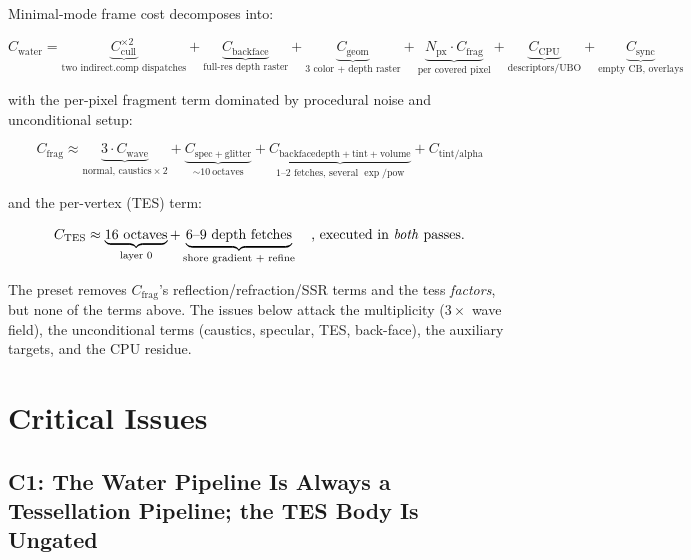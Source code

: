 \documentclass[11pt,a4paper]{article}
\begin{document}
Minimal-mode frame cost decomposes into:

\begin{equation}
C_{\mathrm{water}} = \underbrace{C_{\mathrm{cull}}^{\times 2}}_{\text{two indirect.comp dispatches}} + \underbrace{C_{\mathrm{backface}}}_{\text{full-res depth raster}} + \underbrace{C_{\mathrm{geom}}}_{\text{3 color + depth raster}} + \underbrace{N_{\mathrm{px}} \cdot C_{\mathrm{frag}}}_{\text{per covered pixel}} + \underbrace{C_{\mathrm{CPU}}}_{\text{descriptors/UBO}} + \underbrace{C_{\mathrm{sync}}}_{\text{empty CB, overlays}}
\end{equation}

with the per-pixel fragment term dominated by procedural noise and unconditional setup:

\begin{equation}
C_{\mathrm{frag}} \approx \underbrace{3 \cdot C_{\mathrm{wave}}}_{\text{normal, caustics}\times 2} + \underbrace{C_{\mathrm{spec+glitter}}}_{\sim 10\ \text{octaves}} + \underbrace{C_{\mathrm{backface depth + tint + volume}}}_{\text{1--2 fetches, several } \exp/\mathrm{pow}} + C_{\mathrm{tint/alpha}}
\end{equation}

and the per-vertex (TES) term:

\begin{equation}
C_{\mathrm{TES}} \approx \underbrace{16\ \text{octaves}}_{\text{layer 0}} + \underbrace{6\text{--}9\ \text{depth fetches}}_{\text{shore gradient + refine}} \quad\text{, executed in \emph{both} passes.}
\end{equation}

The preset removes $C_{\mathrm{frag}}$'s reflection/refraction/SSR terms and the tess \emph{factors}, but none of the terms above. The issues below attack the multiplicity
($3\times$ wave field), the unconditional terms (caustics, specular, TES, back-face), the auxiliary targets, and the CPU residue.

\section{Critical Issues}

\subsection{C1: The Water Pipeline Is Always a Tessellation Pipeline; the TES Body Is Ungated}
\end{document}
